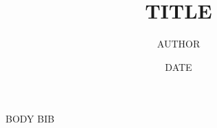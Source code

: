 \documentclass[11pt,a4paper]{article}
\title{{{TITLE}}}
\author{{{AUTHOR}}}
\date{{{DATE}}}
\begin{document}
\maketitle
\begin{abstract}
\end{abstract}
{{BODY}}
{{BIB}}
\end{document}
